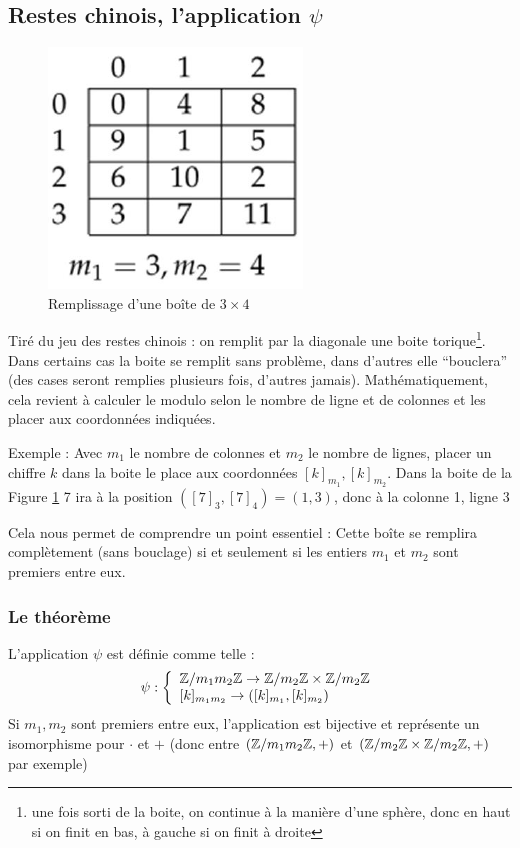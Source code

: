 \documentclass[11pt,a4paper]{article}
\begin{document}
\subsection{Restes chinois, l'application $\psi$}
\begin{figure}
	\includegraphics[scale=0.5]{images/chinois}
	\caption{Remplissage d'une boîte de $3\times 4$}
	\label{chinois}
\end{figure}
Tiré du jeu des restes chinois : on remplit par la diagonale une boite torique\footnote{une fois sorti de la boite, on continue à la manière d'une sphère, donc en haut si on finit en bas, à gauche si on finit à droite}. Dans certains cas la boite se remplit sans problème, dans d'autres elle \enquote{bouclera} (des cases seront remplies plusieurs fois, d'autres jamais). Mathématiquement, cela revient à calculer le modulo selon le nombre de ligne et de colonnes et les placer aux coordonnées indiquées. 
\begin{exemple}[0.7]
Exemple : Avec $m_1$ le nombre de colonnes et $m_2$ le nombre de lignes, placer un chiffre $k$ dans la boite le place aux coordonnées $[k]_{m_1},[k]_{m_2}$. Dans la boite de la Figure \ref{chinois} 7 ira à la position $([7]_{3},[7]_4) = (1,3)$, donc à la colonne 1, ligne 3
\end{exemple}
Cela nous permet de comprendre un point essentiel : Cette boîte se remplira complètement (sans bouclage) si et seulement si les  entiers $m_1$ et $m_2$ sont premiers entre eux.

\subsubsection{Le théorème}
L'application $\psi$ est définie comme telle :
\[\psi : \left\{\begin{array}{l}
	\mathbb{Z}/m_1m_2\mathbb{Z} \to \mathbb{Z} / m_2 \mathbb{Z} \times \mathbb{Z} / m_2 \mathbb{Z} \\
	{}[k]_{m_1 m_2} \to ([k]_{m_1},[k]_{m_2})
\end{array}\right.\]
Si $m_1,m_2$ sont premiers entre eux, l'application est bijective et représente un isomorphisme pour $\cdot$ et $+$ (donc entre $(\mathbb{Z}/m_1m_2\mathbb{Z}, +)$ et $(\mathbb{Z}/m_2\mathbb{Z}\times \mathbb{Z}/m_2\mathbb{Z}, +)$ par exemple)
\end{document}

